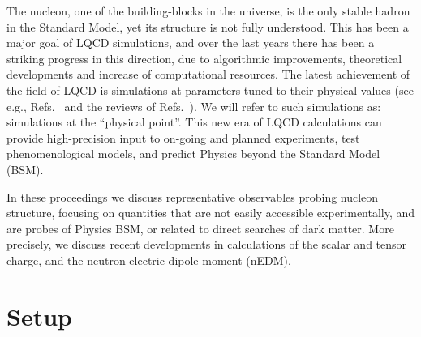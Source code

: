 \documentclass[epj]{webofc}
\begin{document}
The nucleon, one of the building-blocks in the universe, is the only stable hadron in the Standard Model, yet its structure is not fully understood. This has been a major goal of LQCD simulations, and over the last years there has been a striking progress in this direction, due to algorithmic improvements, theoretical developments and increase of computational resources. The latest achievement of the field of LQCD is simulations at
parameters tuned to their physical values (see e.g., Refs.~\cite{Green:2012ud,Green:2014xba,Abdel-Rehim:2015owa,Yang:2015uis,Bhattacharya:2016zcn} and the 
reviews of Refs.~\cite{SaraLat16,ZanottiLat15,Constantinou:2014tga,Syritsyn:2014saa,Lin:2012ev}). We will refer to such simulations as:
simulations at the ``physical point''. This new era of LQCD calculations can provide high-precision input to on-going and planned 
experiments, test phenomenological models, and predict Physics beyond the Standard Model (BSM). 

In these proceedings we discuss representative observables probing nucleon structure, focusing on quantities that are not easily accessible 
experimentally, and are probes of Physics BSM, or related to direct searches of dark matter. More precisely, we discuss recent developments 
in calculations of the scalar and tensor charge, and the neutron electric dipole moment (nEDM). 


\section{Setup}
\label{sec2}
\end{document}

